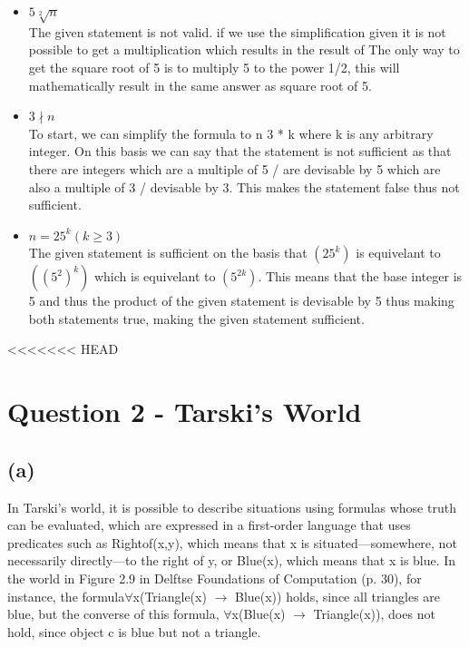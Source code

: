 \documentclass[a4paper]{article}
\begin{document}
\begin{itemize}
    \item $ 5  \sqrt[2]{n} $ \\
    The given statement is not valid. if we use the simplification given it is not possible to get a multiplication which results in the result of 
    The only way to get the square root of 5 is to multiply 5 to the power 1/2, this will mathematically result in the same answer as square root of 5.
    \item $ 3 \nmid n $ \\
    To start, we can simplify the formula to n  3 * k where k is any arbitrary integer.
    On this basis we can say that the statement is not sufficient as that there are integers which are a multiple of 5 / are devisable by 5 which are also a multiple of 3 / devisable by 3.
    This makes the statement false thus not sufficient.
    \item $ n = 25^k (k \ge 3) $ \\ 
    The given statement is sufficient on the basis that $(25^k)$ is equivelant to $ ((5^2)^k) $ which is equivelant to $ (5^{2k}) $.
    This means that the base integer is 5 and thus the product of the given statement is devisable by 5 thus making both statements true, making the given statement sufficient.
    
\end{itemize}

<<<<<<< HEAD
\newpage
\section{Question 2 - Tarski's World}
\subsection{(a)}
In Tarski's world, it is possible to describe situations using formulas whose truth can be evaluated,
which are expressed in a first-order language that uses predicates such as Rightof(x,y),
which means that x is situated—somewhere, not necessarily directly—to the right of y, or Blue(x), which means that x is blue.
In the world in Figure 2.9 in Delftse Foundations of Computation (p. 30), for instance,
the formula$\forall $x(Triangle(x) $\rightarrow $ Blue(x)) holds, since all triangles are blue, but the converse of this
formula, $\forall $x(Blue(x) $\rightarrow $ Triangle(x)), does not hold, since object c is blue but not a triangle.
\end{document}
